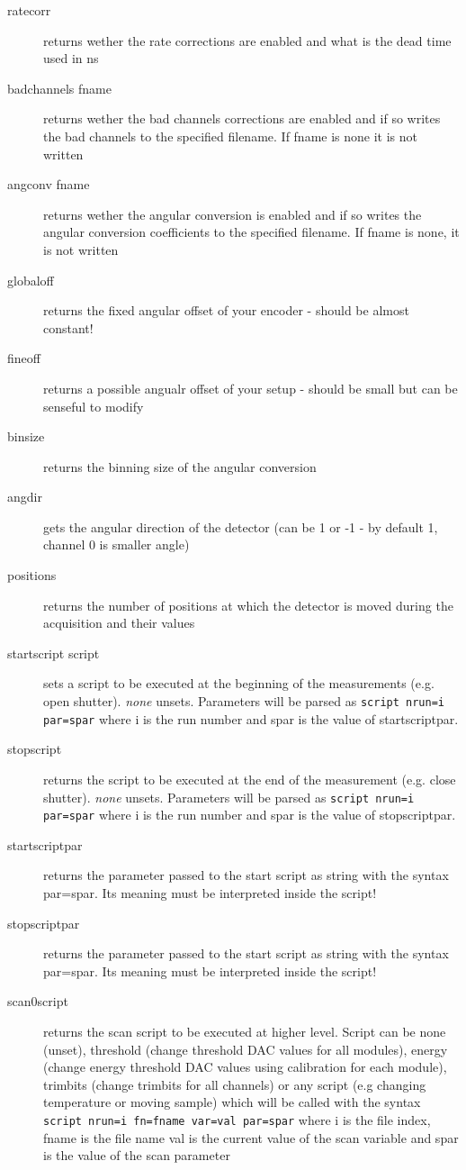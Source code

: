 \documentclass{report}
\begin{document}
\begin{description}
\item[ratecorr]  	returns wether the rate corrections are enabled and what is the dead time used in ns
\item[badchannels fname] 	returns wether the bad channels corrections are enabled and if so writes the bad channels to the specified filename. If fname is none it is not written
\item[angconv fname]  	returns wether the angular conversion is enabled and if so writes the angular conversion coefficients to the specified filename. If fname is none, it is not written
\item[globaloff]  	returns the fixed angular offset of your encoder - should be almost constant!
\item[fineoff]  returns a possible angualr offset of your setup - should be small but can be senseful to modify
\item[binsize]  	returns the binning size of the angular conversion  
\item[angdir] 	gets the angular direction of the detector (can be 1 or -1 - by default 1, channel 0 is smaller angle)  
\item[positions]  	returns the number of positions at which the detector is moved during the acquisition and their values
\item[startscript script] sets a script to be executed at the beginning of the measurements (e.g. open shutter). \textit{none} unsets. Parameters will be parsed as \verb|script nrun=i par=spar| where i is the run number and spar is the value of startscriptpar.
\item[stopscript] returns the script to be executed at the end of the measurement (e.g. close shutter). \textit{none} unsets. Parameters will be parsed as \verb|script nrun=i par=spar| where i is the run number and spar is the value of stopscriptpar.
\item[startscriptpar] returns the parameter passed to the start script as string with the syntax par=spar. Its meaning must be interpreted inside the script!
\item[stopscriptpar]returns the parameter passed to the start script as string with the syntax par=spar. Its meaning must be interpreted inside the script!
\item[scan0script] returns the scan script to be executed at higher level. Script can be none (unset), threshold (change threshold DAC values for all modules), energy (change energy threshold DAC values using calibration for each module), trimbits (change trimbits for all channels) or any script (e.g changing temperature or moving sample) which will be called with the syntax \verb| script nrun=i fn=fname var=val par=spar| where i is the file index, fname is the file name val is the current value of the scan variable and spar is the value of the scan parameter

\end{description}
\end{document}
